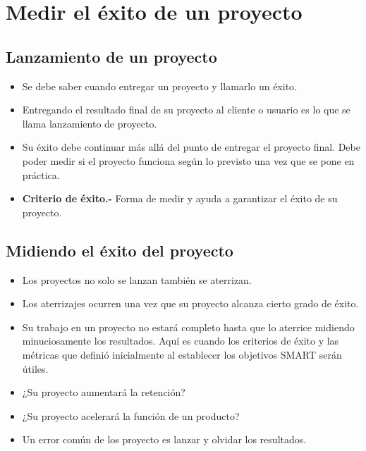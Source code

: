 \documentclass[10pt]{book}
\begin{document}
    \section{Medir el éxito de un proyecto}
	\subsection{Lanzamiento de un proyecto}
	\begin{itemize}
	    \item Se debe saber cuando entregar un proyecto y llamarlo un éxito.
	    \item Entregando el resultado final de su proyecto al cliente o usuario es lo que se llama lanzamiento de proyecto.
	    \item Su éxito debe continuar más allá del punto de entregar el proyecto final. Debe poder medir si el proyecto funciona según lo previsto una vez que se pone en práctica.
	    \item \textbf{Criterio de éxito.-} Forma de medir y ayuda a garantizar el éxito de su proyecto.
	\end{itemize}

	\subsection{Midiendo el éxito del proyecto}
	    \begin{itemize}
		\item Los proyectos no solo se lanzan también se aterrizan.
		\item Los aterrizajes ocurren una vez que su proyecto alcanza cierto grado de éxito.
		\item Su trabajo en un proyecto no estará completo hasta que lo aterrice  midiendo minuciosamente los resultados. Aquí es cuando los criterios de éxito y las métricas que definió inicialmente al establecer los objetivos SMART serán útiles.  
		\item ¿Su proyecto aumentará la retención?
		\item ¿Su proyecto acelerará la función de un producto?
		\item Un error común de los proyecto es lanzar y olvidar los resultados.
	    \end{itemize}
\end{document}
